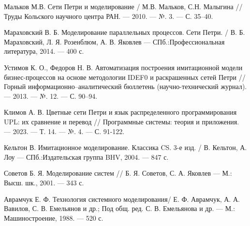 \begin{thebibliography}{}
 Мальков М.В. Сети Петри и моделирование / М.В. Мальков, С.Н. Малыгина // Труды Кольского научного центра РАН. --- 2010. --- №. 3. --- С. 35--40.

 Мараховский В. Б. Моделирование параллельных процессов. Сети Петри. / В. Б. Мараховский, Л. Я. Розенблюм,  А. В. Яковлев --- СПб.:Профессиональная литература, 2014. --- 400 с.

 Устимов К. О., Федоров Н. В. Автоматизация построения имитационной модели бизнес-процессов на основе методологии IDEF0 и раскрашенных сетей Петри // Горный информационно--аналитический бюллетень (научно-технический журнал). --- 2013. --- №. 12. --- С. 90--94.

 Климов А. В. Цветные сети Петри и язык распределенного программирования UPL: их сравнение и перевод // Программные системы: теория и приложения. --- 2023. --- Т. 14. --- №. 4. --- С. 91-122.

 Кельтон В. Имитационное моделирование. Классика CS. 3-е изд. / В. Кельтон, А. Лоу --- СПб.:Издательская группа BHV, 2004. --- 847 с.

 Советов Б. Я. Моделирование систем //  Б. Я. Советов, С. А. Яковлев --- М.: Высш. шк., 2001. --- 343 с.

 Аврамчук Е. Ф. Технология системного моделирования/ Е. Ф. Аврамчук, А. А. Вавилов, С. В. Емельянов и др.; Под общ. ред. С. В. Емельянова и др. — М.: Машиностроение, 1988. --- 520 с.

\end{thebibliography}